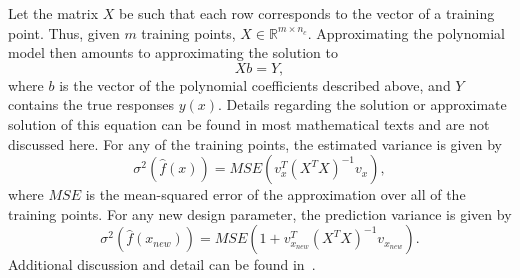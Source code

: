 Let the matrix $X$ be such that each row corresponds to the vector of a
training point. Thus, given $m$ training points, $X \in \mathbb{R}^{m \times
n_c}$. Approximating the polynomial model then amounts to approximating the
solution to
\begin{equation}
Xb = Y,
\end{equation} 
where $b$ is the vector of the polynomial coefficients described above, and $Y$
contains the true responses $y(x)$. Details regarding the solution or
approximate solution of this equation can be found in most mathematical texts
and are not discussed here. For any of the training points, the estimated
variance is given by
\begin{equation}
\sigma^{2}\left(\hat{f}(x)\right) = MSE\left(v_x^{T} (X^{T} X)^{-1} v_x\right),
\end{equation} 
where $MSE$ is the mean-squared error of the approximation over all of the
training points. For any new design parameter, the prediction variance is
given by 
\begin{equation}\label{eq:poly_var}
\sigma^{2}\left(\hat{f}(x_{new})\right) = MSE\left(1 + v_{x_{new}}^{T} 
(X^{T} X)^{-1} v_{x_{new}} \right).
\end{equation}
Additional discussion and detail can be found in~\cite{Net85}.



